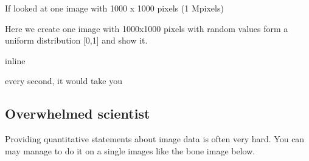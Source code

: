 \documentclass[letterpaper,10pt,english]{sphinxmanual}
\begin{document}
\sphinxAtStartPar
If  looked at one image with 1000 x 1000 pixels (1 Mpixels)

\sphinxAtStartPar
Here we create one image with 1000x1000 pixels with random values form a uniform distribution {[}0,1{]} and show it.

\begin{sphinxVerbatim}[commandchars=\\\{\}]
 inline
   
   

    
             
\end{sphinxVerbatim}

\sphinxAtStartPar
every second, it would take you

\begin{sphinxVerbatim}[commandchars=\\\{\}]
      
  
       

  
\end{sphinxVerbatim}


\subsection{Overwhelmed scientist}
\label{\detokenize{01-Introduction:overwhelmed-scientist}}
\sphinxAtStartPar
Providing quantitative statements about image data is often very hard. You can may manage to do it on a single images like the bone image below.
\end{document}
